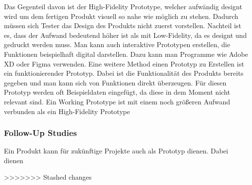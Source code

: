 \documentclass{article}
\begin{document}
	Das Gegenteil davon ist der High-Fidelity Prototype, welcher aufwändig designt wird um dem fertigen Produkt visuell so nahe wie möglich zu stehen. Dadurch müssen sich Tester das Design des Produkts nicht zuerst vorstellen. Nachteil ist es, dass der Aufwand bedeutend höher ist als mit Low-Fidelity, da es designt und gedruckt werden muss. Man kann auch interaktive Prototypen erstellen, die Funktionen beispielhaft digital darstellen. Dazu kann man Programme wie Adobe XD oder Figma verwenden.
	Eine weitere Method einen Prototyp zu Erstellen ist ein funktionierender Prototyp. Dabei ist die Funktionalität des Produkts bereits gegeben und man kann sich von Funktionen direkt überzeugen. Für diesen Prototyp werden oft Beispieldaten eingefügt, da diese in dem Moment nicht relevant sind. Ein Working Prototype ist mit einem noch größeren Aufwand verbunden als ein High-Fidelity Prototype
	\subsubsection{Follow-Up Studies}
	Ein Produkt kann für zukünftige Projekte auch als Prototyp dienen. Dabei dienen 
	
>>>>>>> Stashed changes















  
\end{document}
